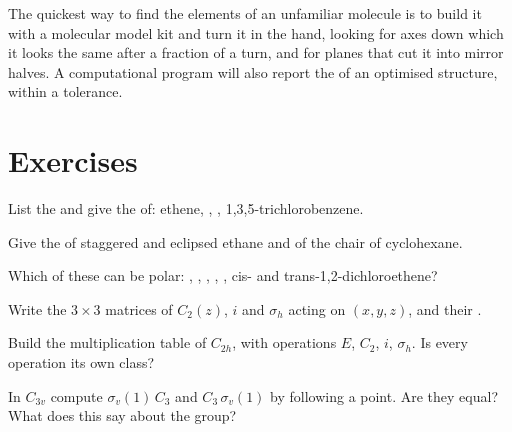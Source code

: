 \begin{inthelab}
The quickest way to find the elements of an unfamiliar molecule is to build
it with a molecular model kit and turn it in the hand, looking for axes
down which it looks the same after a fraction of a turn, and for planes
that cut it into mirror halves. A computational program will also report
the  of an optimised structure, within a tolerance.
\end{inthelab}

\section{Exercises}

\begin{exercise}[$\star$]\label{exo:b3:point-groups:1}
List the  and give the  of: ethene, ,
, 1,3,5-trichlorobenzene.
\end{exercise}

\begin{exercise}[$\star$]\label{exo:b3:point-groups:2}
Give the  of staggered and eclipsed ethane and of the chair of
cyclohexane.
\end{exercise}

\begin{exercise}[$\star$]\label{exo:b3:point-groups:3}
Which of these can be polar: , , , , ,
cis- and trans-1,2-dichloroethene?
\end{exercise}

\begin{exercise}[$\star$]\label{exo:b3:point-groups:4}
Write the $3\times3$ matrices of $C_2(z)$, $i$ and $\sigma_h$ acting on $(x, y, z)$,
and their .
\end{exercise}

\begin{exercise}[$\star\star$]\label{exo:b3:point-groups:5}
Build the multiplication table of $C_{2h}$, with operations $E$, $C_2$, $i$,
$\sigma_h$. Is every operation its own class?
\end{exercise}

\begin{exercise}[$\star\star$]\label{exo:b3:point-groups:6}
In $C_{3v}$ compute $\sigma_v(1)\,C_3$ and $C_3\,\sigma_v(1)$ by following a point.
Are they equal? What does this say about the group?
\end{exercise}

